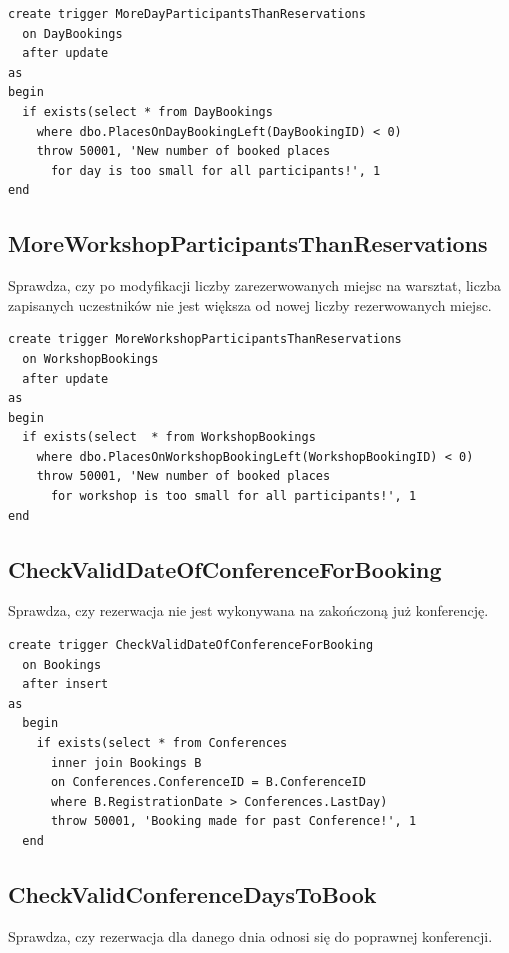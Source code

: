 \documentclass[12pt, a4paper]{mwrep}
\begin{document}
\begin{lstlisting}
create trigger MoreDayParticipantsThanReservations
  on DayBookings
  after update
as
begin
  if exists(select * from DayBookings 
    where dbo.PlacesOnDayBookingLeft(DayBookingID) < 0)
    throw 50001, 'New number of booked places 
      for day is too small for all participants!', 1
end
\end{lstlisting}

\subsection{MoreWorkshopParticipantsThanReservations}

\noindent Sprawdza, czy po modyfikacji liczby zarezerwowanych miejsc na warsztat, liczba zapisanych uczestników nie jest większa od nowej liczby rezerwowanych miejsc.

\begin{lstlisting}
create trigger MoreWorkshopParticipantsThanReservations
  on WorkshopBookings
  after update
as
begin
  if exists(select  * from WorkshopBookings
    where dbo.PlacesOnWorkshopBookingLeft(WorkshopBookingID) < 0)
    throw 50001, 'New number of booked places 
      for workshop is too small for all participants!', 1
end
\end{lstlisting}

\subsection{CheckValidDateOfConferenceForBooking}

\noindent Sprawdza, czy rezerwacja nie jest wykonywana na zakończoną już konferencję.

\begin{lstlisting}
create trigger CheckValidDateOfConferenceForBooking
  on Bookings
  after insert
as
  begin
    if exists(select * from Conferences
      inner join Bookings B 
      on Conferences.ConferenceID = B.ConferenceID
      where B.RegistrationDate > Conferences.LastDay)
      throw 50001, 'Booking made for past Conference!', 1
  end
\end{lstlisting}

\subsection{CheckValidConferenceDaysToBook}

\noindent Sprawdza, czy rezerwacja dla danego dnia odnosi się do poprawnej konferencji.
\end{document}
